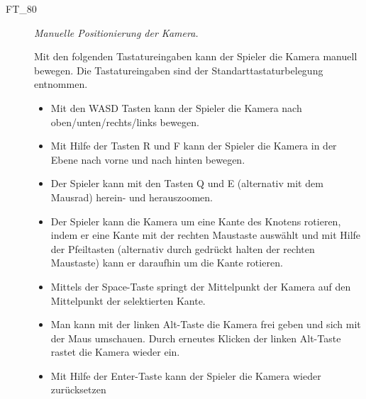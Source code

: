 \begin{description}
		\item[FT\_80] \textit{Manuelle Positionierung der Kamera.} \hfill\\
	
	\label{FT:80}
	
	Mit den folgenden Tastatureingaben kann der Spieler die Kamera manuell bewegen. Die Tastatureingaben sind der Standarttastaturbelegung entnommen.
	
			\begin{itemize} 
        \item Mit den WASD Tasten kann der Spieler die Kamera nach oben/unten/rechts/links bewegen.
        \item Mit Hilfe der Tasten R und F kann der Spieler die Kamera in der Ebene nach vorne und nach hinten bewegen.
        \item Der Spieler kann mit den Tasten Q und E (alternativ mit dem Mausrad) herein- und herauszoomen.
        \item Der Spieler kann die Kamera um eine Kante des Knotens rotieren, indem er eine Kante mit der rechten Maustaste auswählt und mit Hilfe der Pfeiltasten (alternativ durch gedrückt halten der rechten Maustaste) kann er daraufhin um die Kante rotieren.
        \item Mittels der Space-Taste springt der Mittelpunkt der Kamera auf den Mittelpunkt der selektierten Kante.
        \item Man kann mit der linken Alt-Taste die Kamera frei geben und sich mit der Maus umschauen. Durch erneutes Klicken der linken Alt-Taste rastet die Kamera wieder ein.
        \item Mit Hilfe der Enter-Taste kann der Spieler die Kamera wieder zurücksetzen
		
		\end{itemize}
	
\end{description}









